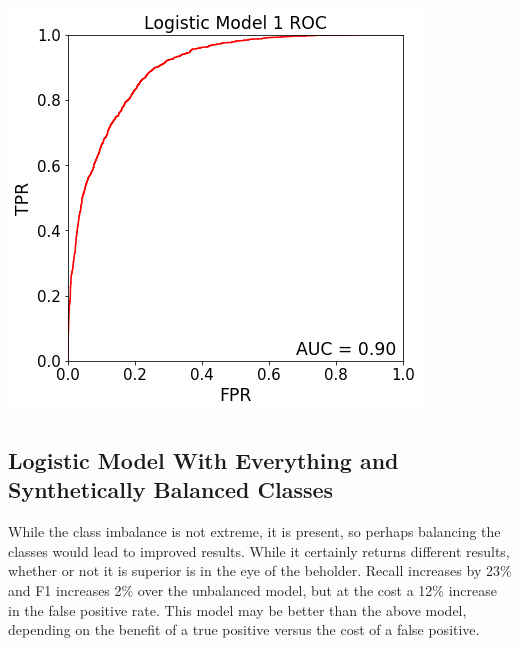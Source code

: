 \documentclass{article}
\begin{document}
	\begin{multicols}{2}
	\begin{center}
	
	\includegraphics[scale = .4]{Logistic Model 1_ROC}
	
	\columnbreak
	
	
	
	\vspace{0.2 in}
	
	
	
	
	\end{center}
	\end{multicols}

\subsection{Logistic Model With Everything and \\ Synthetically Balanced Classes}

While the class imbalance is not extreme, it is present, so perhaps balancing the classes would lead to improved results.  While it certainly returns different results, whether or not it is superior is in the eye of the beholder.  Recall increases by 23\% and F1 increases 2\% over the unbalanced model, but at the cost a 12\% increase in the false positive rate.  This model may be better than the above model, depending on the benefit of a true positive versus the cost of a false positive.
\end{document}
